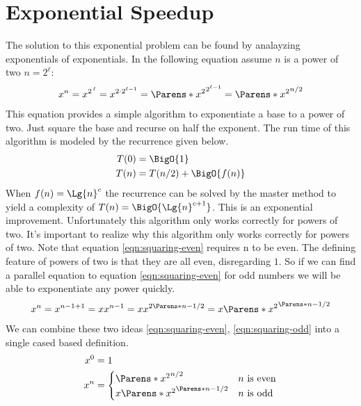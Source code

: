 \documentclass[./Thesis.tex]{subfiles}
\begin{document}
\section{Exponential Speedup}
\label{sec:exponential-speedup}
The solution to this exponential problem can be found by analayzing exponentials
of exponentials. In the following equation assume $n$ is a power of two $n = 2^\ell$:
\begin{align}
  \label{eqn:squaring-even}
  x^n = x^{2^{\, \ell}}
  {}  = x^{2 \cdot 2^{\ell - 1}}
  {}  = \Parens*{x^2}^{2^{\ell - 1}}
  {}  = \Parens*{x^2}^{n / 2}
\end{align}
This equation provides a simple algorithm to exponentiate a base to a power of
two. Just square the base and recurse on half the exponent. The run time of this
algorithm is modeled by the recurrence given below.
\begin{align}
  \label{eqn:power-of-two-recurrance}
  \begin{split}
    T(0) &= \BigO{1} \\
    T(n) &= T(n / 2) + \BigO{f(n)}
  \end{split}
\end{align}
When $f(n) = \Lg{n}^c$ the recurrence can be solved by the master method
\cite{clrs} to yield a complexity of $T(n) = \BigO{\Lg{n}^{c + 1}}$. This is an
exponential improvement. Unfortunately this algorithm only works correctly for
powers of two. It's important to realize why this algorithm only works correctly
for powers of two. Note that equation \ref{eqn:squaring-even} requires n to be
even. The defining feature of powers of two is that they are all even,
disregarding $1$. So if we can find a parallel equation to equation
\ref{eqn:squaring-even} for odd numbers we will be able to exponentiate any power
quickly.
\begin{align}
  \label{eqn:squaring-odd}
  x^n = x^{n - 1 + 1} = x x^{n - 1} = x x^{2\Parens*{n - 1} / 2} = x \Parens*{x^2}^{\Parens*{n - 1} / 2}
\end{align}
We can combine these two ideas \ref{eqn:squaring-even}, \ref{eqn:squaring-odd}
into a single cased based definition.
\begin{align}
  \label{eqn:squaring-def-division}
  \begin{split}
    x^0 &= 1 \\
    x^n &=
    \begin{cases}
      \Parens*{x^2}^{n / 2} & n \text{ is even} \\
      x \Parens*{x^2}^{\Parens*{n - 1} / 2} & n \text{ is odd}
    \end{cases}
  \end{split}
\end{align}
\end{document}
